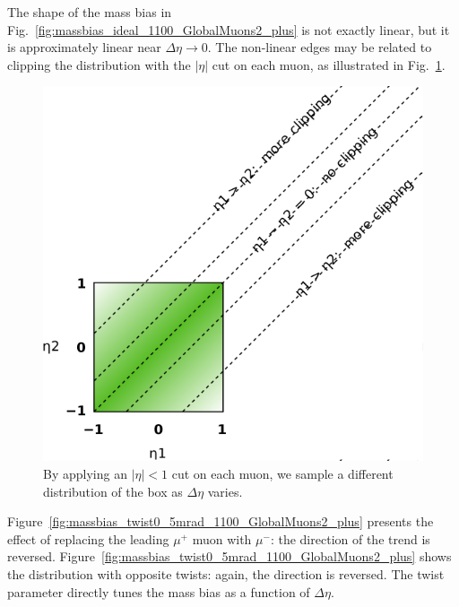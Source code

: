\documentclass[12pt]{article}
\begin{document}
The shape of the mass bias in
Fig.~\ref{fig:massbias_ideal_1100_GlobalMuons2_plus} is not exactly
linear, but it is approximately linear near $\Delta \eta \to 0$.  The
non-linear edges may be related to clipping the distribution with the
$|\eta|$ cut on each muon, as illustrated in Fig.~\ref{fig:clipping}.

\begin{figure}
\begin{center}
\includegraphics[width=0.5\linewidth]{clipping.pdf}
\end{center}
\caption{By applying an $|\eta| < 1$ cut on each muon, we sample a
  different distribution of the box as $\Delta\eta$ varies. \label{fig:clipping}}
\end{figure}

Figure~\ref{fig:massbias_twist0_5mrad_1100_GlobalMuons2_plus}
presents the effect of replacing the leading $\mu^+$ muon with
$\mu^-$: the direction of the trend is reversed.
Figure~\ref{fig:massbias_twist0_5mrad_1100_GlobalMuons2_plus} shows
the distribution with opposite twists: again, the direction is
reversed.  The twist parameter directly tunes the mass bias as a
function of $\Delta \eta$.
\end{document}
